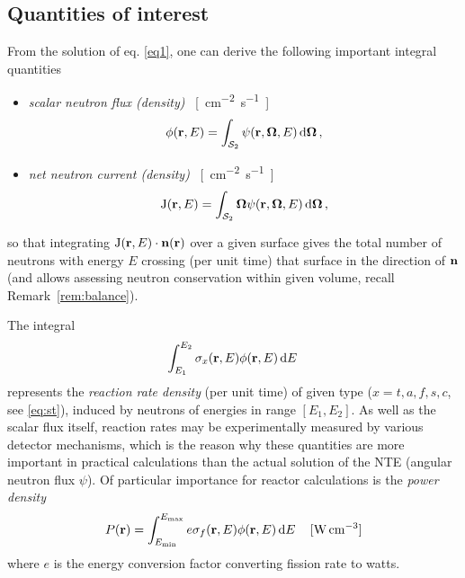 \subsection{Quantities of interest}\label{sec:qoi}
From the solution of eq. \eqref{eq1}, one can derive the following important integral quantities
\begin{itemize}
  \item \textit{scalar neutron flux (density)} \SI{}{[cm^{-2}.s^{-1}]}
  \begin{equation}\label{eq:scalar_flux}
    \phi(\mathbf{r}, E) = \int_{\mathcal{S}_2}\psi(\mathbf{r},\mathbf{\Omega},E)\,\text{d}\mathbf{\Omega}\,,
  \end{equation}
  \item \textit{net neutron current (density)} \SI{}{[cm^{-2}.s^{-1}]}
	\begin{equation}\label{eq:bJ}
		\mathrm{J}(\mathbf{r}, E)	= \int_{\mathcal{S}_2}\mathbf{\Omega}\psi(\mathbf{r},\mathbf{\Omega},E)\,\text{d}\mathbf{\Omega}\,,
	\end{equation}
\end{itemize}
so that integrating $\mathrm{J}(\mathbf{r},E)\cdot\mathbf{n}(\mathbf{r})$ over a given surface 
gives the total number of neutrons with energy $E$ crossing (per unit time) that surface in the direction of 
$\mathbf{n}$ (and allows assessing neutron conservation within given volume, recall Remark~\ref{rem:balance}).

The integral
\begin{equation}\label{eq:rr}
  \int_{E_1}^{E_2}\sigma_x(\mathbf{r}, E) \phi(\mathbf{r}, E)\,\text{d}E\,
\end{equation}
represents the \textit{reaction rate density} (per unit time) of given type ($x = t,a,f,s,c$, see
\eqref{eq:st}), induced by neutrons of energies in range $[E_1, E_2]$. 
As well as the scalar flux itself, reaction rates may be experimentally measured
by various detector mechanisms, which is the reason why these quantities are more important in practical calculations
than the actual solution of the NTE (angular neutron flux $\psi$). Of particular importance for reactor calculations is
the
\textit{power density} 
\begin{equation}\label{eq:power}
	P(\mathbf{r}) = \int_{E_{\text{min}}}^{E_{\text{max}}}e\sigma_f(\mathbf{r}, E) \phi(\mathbf{r}, E)\,\text{d}E\, \quad \SI{}{[W.cm^{-3}]}
\end{equation}
where $e$ is the energy conversion factor converting fission rate to watts.


